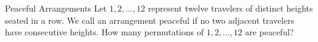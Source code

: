 \begin{problem}{Peaceful Arrangements}
    Let \(1,2,\dots,12\) represent twelve travelers of distinct heights seated in a row. We call an arrangement peaceful if no two adjacent travelers have consecutive heights. How many permutations of \(1,2,\dots,12\) are peaceful?
\end{problem}

